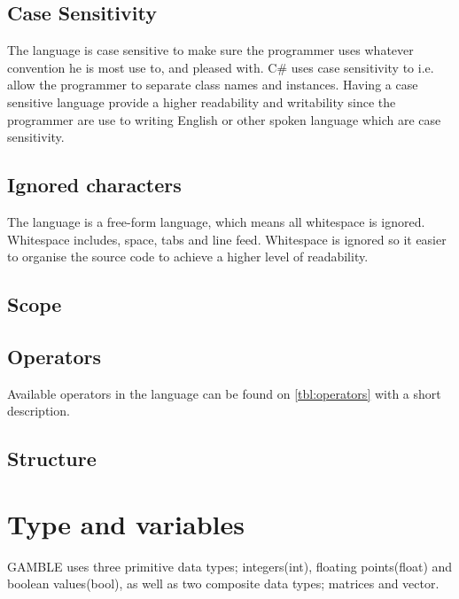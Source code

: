 \subsection{Case Sensitivity}
The language is case sensitive to make sure the programmer uses whatever convention he is most use to, and pleased with.
C\# uses case sensitivity to i.e. allow the programmer to separate class names and instances.
Having a case sensitive language provide a higher readability and writability since the programmer are use to writing English or other spoken language which are case sensitivity.

\subsection{Ignored characters}
The language is a free-form language, which means all whitespace is ignored.
Whitespace includes, space, tabs and line feed.
Whitespace is ignored so it easier to organise the source code to achieve a higher level of readability.

\subsection{Scope}

\subsection{Operators}
Available operators in the language can be found on \ref{tbl:operators} with a short description.
  

\subsection{Structure} 


\section{Type and variables}
GAMBLE uses three primitive data types; integers(int), floating points(float) and boolean values(bool), as well as two composite data types; matrices and vector.

